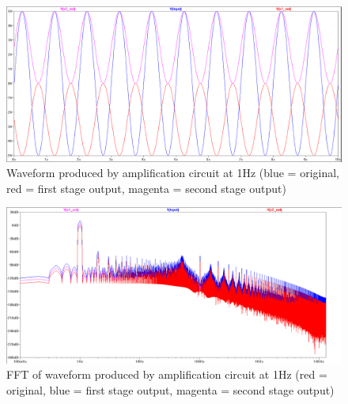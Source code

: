 \begin{landscape}
  \begin{figure}[ht]
    \includegraphics[width=\linewidth]{img/amplifier/waveform_inverted.png}
    \caption[Amplification Circuit Waveform]{Waveform produced by amplification circuit at 1Hz (blue = original,
      red = first stage output, magenta = second stage output)}
    \label{fig:amp_sim:waveform}
  \end{figure}
\end{landscape}

\begin{landscape}
  \begin{figure}[ht]
    \includegraphics[width=\linewidth]{img/amplifier/fft_inverted.png}
    \caption[Amplification Circuit Frequency Spectrum]{FFT of waveform produced by amplification circuit at 1Hz (red =
      original, blue = first stage output, magenta = second stage output)}
    \label{fig:amp_sim:fft}
  \end{figure}
\end{landscape}

